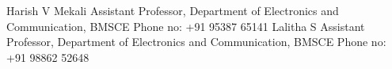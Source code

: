 \begin{cvhonors}
  \cvhonor
    {Harish V Mekali}
    {Assistant Professor, Department of Electronics and Communication, BMSCE \newline Phone no: +91 95387 65141}
    {}
    {}
     \cvhonor
    {Lalitha S}
    {Assistant Professor, Department of Electronics and Communication, BMSCE \newline Phone no: +91 98862 52648}
    {}
    {}
    
\end{cvhonors}
